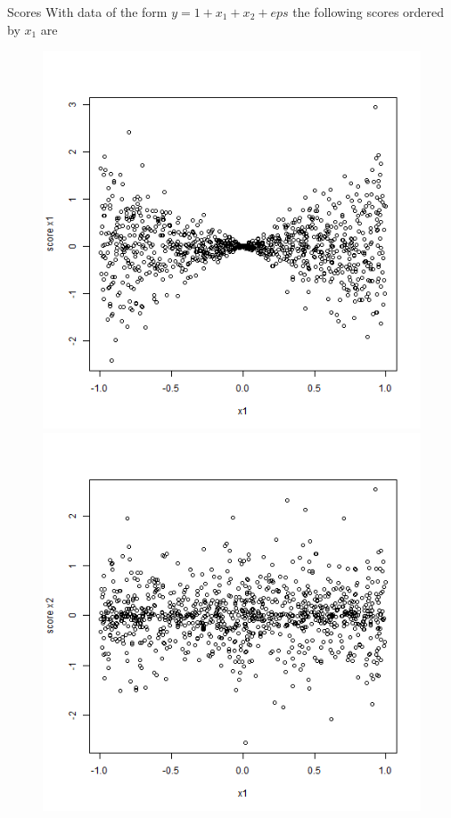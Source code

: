 \documentclass[9pt, xcolor=table]{beamer}
\begin{document}
\begin{frame}{Scores}
With data of the form $y = 1 + x_1 + x_2 + eps$ the following scores ordered by $x_{1}$ are
\begin{figure}
    \centering
    \begin{minipage}{0.45\textwidth}
        \centering
        \includegraphics[width=1\textwidth]{Figures/Scores/correctly_specified_scores_x1_x1.png} 
    \end{minipage}\hfill
    \begin{minipage}{0.45\textwidth}
        \centering
        \includegraphics[width=1\textwidth]{Figures/Scores/correctly_specified_scores_x2_x1.png} 
    \end{minipage}
\end{figure}

\end{frame}
\end{document}
